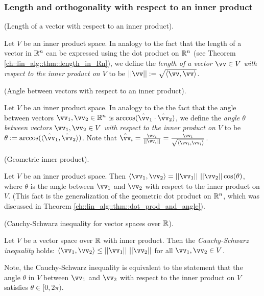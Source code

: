 \subsubsection*{Length and orthogonality with respect to an inner product}

\begin{defn}
    (Length of a vector with respect to an inner product). 
    
    Let $V$ be an inner product space. In analogy to the fact that the length of a vector in $\mathbb{R}^n$ can be expressed using the dot product on $\mathbb{R}^n$ (see Theorem \ref{ch::lin_alg::thm::length_in_Rn}), we define the \textit{length of a vector $\vv \in V$ with respect to the inner product on $V$} to be $||\vv|| := \sqrt{\langle \vv, \vv \rangle}$.
\end{defn}

\begin{defn}
    (Angle between vectors with respect to an inner product). 
    
    Let $V$ be an inner product space. In analogy to the the fact that the angle between vectors $\vv_1, \vv_2 \in \R^n$ is $\arccos(\hat{\vv}_1 \cdot \hat{\vv}_2)$, we define the \textit{angle $\theta$ between vectors $\vv_1, \vv_2 \in V$ with respect to the inner product on $V$} to be $\theta := \arccos(\langle \hat{\vv}_1, \hat{\vv}_2 \rangle)$. Note that $\hat{\vv}_i = \frac{\vv_i}{||\vv_i||} = \frac{\vv_i}{\sqrt{\langle \vv_i, \vv_i \rangle}}$.
\end{defn}

\begin{remark}
    (Geometric inner product).
    
    Let $V$ be an inner product space. Then $\langle \vv_1, \vv_2 \rangle = ||\vv_1||\spc||\vv_2|| \cos(\theta)$, where $\theta$ is the angle between $\vv_1$ and $\vv_2$ with respect to the inner product on $V$. (This fact is the generalization of the geometric dot product on $\mathbb{R}^n$, which was discussed in Theorem \ref{ch::lin_alg::thm::dot_prod_and_angle}).
\end{remark}

\begin{theorem}
\label{ch::bilinear_forms_metric_tensors::thm::Cauchy_Schwarz}
     (Cauchy-Schwarz inequality for vector spaces over $\mathbb{R}$).
     
     Let $V$ be a vector space over $\mathbb{R}$ with inner product. Then the \textit{Cauchy-Schwarz inequality} holds: $\langle \vv_1, \vv_2 \rangle \leq ||\vv_1|| \spc ||\vv_2||$ for all $\vv_1, \vv_2 \in V$. 
     
     Note, the Cauchy-Schwarz inequality is equivalent to the statement that the angle $\theta$ in $V$ between $\vv_1$ and $\vv_2$ with respect to the inner product on $V$ satisfies $\theta \in [0, 2 \pi)$.
\end{theorem}

